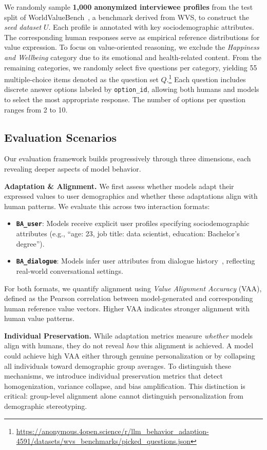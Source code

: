 \documentclass[11pt,a4paper]{article}
\newcommand{\paratitle}[1]{\smallskip\noindent\textbf{#1}}
\begin{document}
We randomly sample \textbf{1,000 anonymized interviewee profiles} from the test split of WorldValueBench~\citep{zhao2024worldvaluesbenchlargescalebenchmarkdataset}, a benchmark derived from WVS, to construct the \textit{seed dataset} \(U\). Each profile is annotated with key sociodemographic attributes. The corresponding human responses serve as empirical reference distributions for value expression. To focus on value-oriented reasoning, we exclude the \textit{Happiness and Wellbeing} category due to its emotional and health-related content. From the remaining categories, we randomly select five questions per category, yielding 55 multiple-choice items denoted as the question set \(Q\).\footnote{\url{https://anonymous.4open.science/r/llm_behavior_adaption-4591/datasets/wvs_benchmarks/picked_questions.json}} Each question includes discrete answer options labeled by \texttt{option\_id}, allowing both humans and models to select the most appropriate response. The number of options per question ranges from 2 to 10.


\subsection{Evaluation Scenarios}


Our evaluation framework builds progressively through three dimensions, each revealing deeper aspects of model behavior.

\paratitle{Adaptation \& Alignment.}
We first assess whether models adapt their expressed values to user demographics and whether these adaptations align with human patterns. We evaluate this across two interaction formats:
\begin{itemize}
    \item \textbf{\texttt{BA\_user}}: Models receive explicit user profiles specifying sociodemographic attributes (e.g., ``age: 23, job title: data scientist, education: Bachelor's degree'').
    \item \textbf{\texttt{BA\_dialogue}}: Models infer user attributes from dialogue history~\cite{gupta-etal-2024-llm}, reflecting real-world conversational settings.
\end{itemize}
For both formats, we quantify alignment using \textit{Value Alignment Accuracy} (VAA), defined as the Pearson correlation between model-generated and corresponding human reference value vectors. Higher VAA indicates stronger alignment with human value patterns.


\paratitle{Individual Preservation.}
While adaptation metrics measure \textit{whether} models align with humans, they do not reveal \textit{how} this alignment is achieved. A model could achieve high VAA either through genuine personalization or by collapsing all individuals toward demographic group averages. To distinguish these mechanisms, we introduce individual preservation metrics that detect homogenization, variance collapse, and bias amplification. This distinction is critical: group-level alignment alone cannot distinguish personalization from demographic stereotyping.
\end{document}
